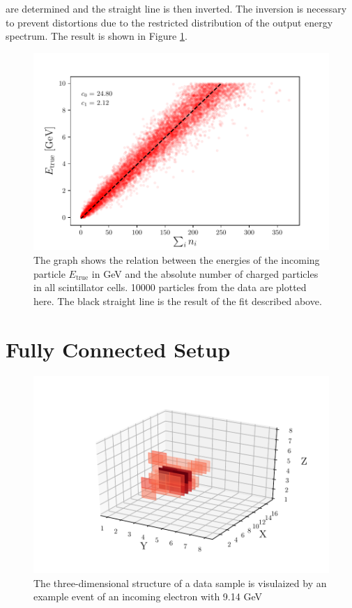\documentclass[12pt, a4paper]{thesis}
\begin{document}
are determined and the straight line is then inverted. The inversion
is necessary to prevent distortions due to the restricted distribution
of the output energy spectrum. The result is shown in Figure
\ref{e-vs-sum_n_fit}.


\begin{figure}[H]
  \centering
  \includegraphics[width=.9\linewidth]{../images/e-vs-sum_n_fit.pdf}
  \caption{ The graph shows the relation between the energies of the
    incoming particle \(E_{\text{true}}\) in GeV and the absolute number
    of charged particles in all scintillator cells.  10000 particles
    from the data are plotted here. The black straight line is the
    result of the fit described above.}
  \label{e-vs-sum_n_fit}
\end{figure}

\section{Fully Connected Setup}
\label{sec:orgb3e1899}

\begin{figure}[H]
  \centering
  \includegraphics[width=.9\linewidth]{../images/data_display.pdf}
  \caption{The three-dimensional structure of a data sample is
    visulaized by an example event of an incoming electron with
    9.14 GeV}
  \label{data_display}
\end{figure}
\end{document}
